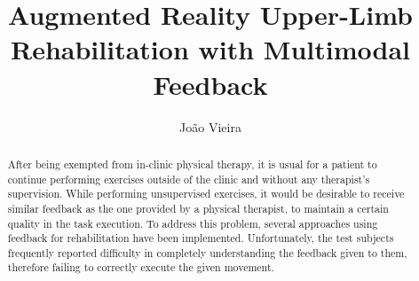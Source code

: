\documentclass[runningheads]{llncs}
\begin{document}
\label{contbegin}

\title{Augmented Reality Upper-Limb Rehabilitation with Multimodal Feedback}


\author{Jo\~{a}o Vieira}





\maketitle


\begin{abstract}
	After being exempted from in-clinic physical therapy, 
	it is usual for a patient to continue performing exercises 
	outside of the clinic and without any therapist's supervision.
	While performing unsupervised exercises, it would be desirable 
	to receive similar feedback as the one provided by a physical therapist, to maintain 
	a certain quality in the task execution.
	To address this problem, several approaches using feedback for rehabilitation have been implemented. Unfortunately, the test subjects frequently reported difficulty in completely understanding the feedback given to them, therefore failing to correctly execute the given movement.
	
	
	
	
	
\end{abstract}
\end{document}
